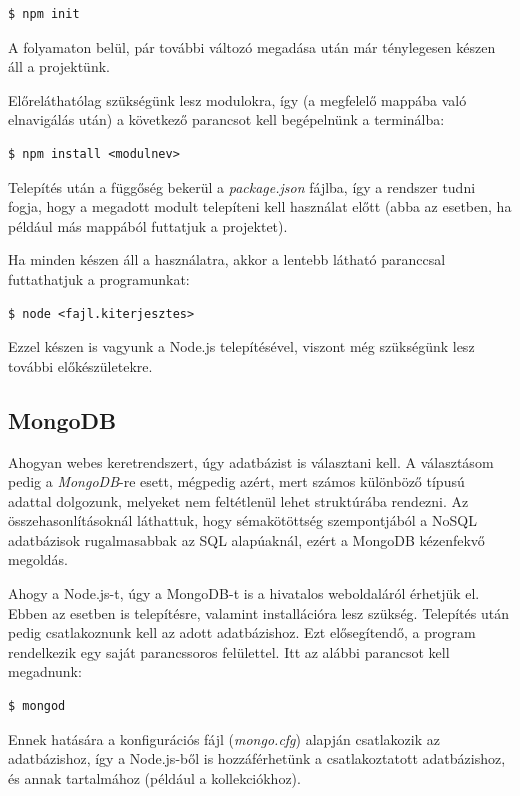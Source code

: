 \begin{verbatim}
$ npm init
\end{verbatim}

A folyamaton belül, pár további változó megadása után már ténylegesen készen áll a projektünk.

Előreláthatólag szükségünk lesz modulokra, így (a megfelelő mappába való elnavigálás után) a következő parancsot kell begépelnünk a terminálba:

\begin{verbatim}
$ npm install <modulnev>
\end{verbatim}

Telepítés után a függőség bekerül a \textit{package.json} fájlba, így a rendszer tudni fogja, hogy a megadott modult telepíteni kell használat előtt (abba az esetben, ha például más mappából futtatjuk a projektet).

Ha minden készen áll a használatra, akkor a lentebb látható paranccsal futtathatjuk a programunkat:

\begin{verbatim}
$ node <fajl.kiterjesztes>
\end{verbatim}

Ezzel készen is vagyunk a Node.js telepítésével, viszont még szükségünk lesz további előkészületekre.

\subsection{MongoDB}

Ahogyan webes keretrendszert, úgy adatbázist is választani kell. A választásom pedig a \textit{MongoDB}-re esett, mégpedig azért, mert számos különböző típusú adattal dolgozunk, melyeket nem feltétlenül lehet struktúrába rendezni. Az összehasonlításoknál láthattuk, hogy sémakötöttség szempontjából a NoSQL adatbázisok rugalmasabbak az SQL alapúaknál, ezért a MongoDB kézenfekvő megoldás.

Ahogy a Node.js-t, úgy a MongoDB-t is a hivatalos weboldaláról érhetjük el. Ebben az esetben is telepítésre, valamint installációra lesz szükség. Telepítés után pedig csatlakoznunk kell az adott adatbázishoz. Ezt elősegítendő, a program rendelkezik egy saját parancssoros felülettel. Itt az alábbi parancsot kell megadnunk:

\begin{verbatim}
$ mongod
\end{verbatim}

Ennek hatására a konfigurációs fájl (\textit{mongo.cfg}) alapján csatlakozik az adatbázishoz, így a Node.js-ből is hozzáférhetünk a csatlakoztatott adatbázishoz, és annak tartalmához (például a kollekciókhoz).

